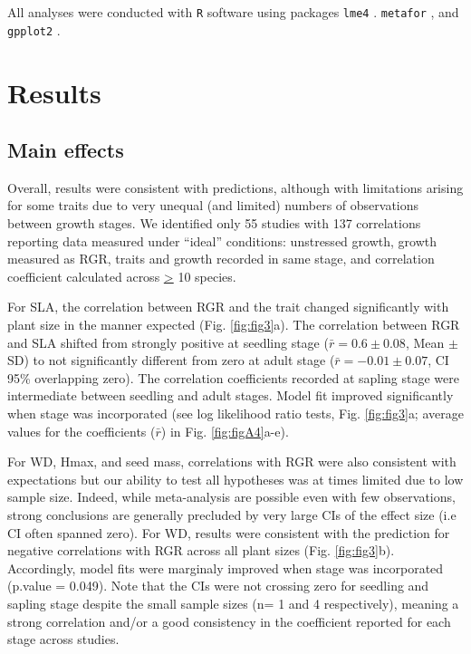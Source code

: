 \documentclass[a4paper,11pt]{article}
\begin{document}
All analyses were conducted with \texttt{R} software \citep{Ralanguageanden:2014wf} using packages \texttt{lme4} \citep{Bates-2014}. \texttt{metafor} \citep{Viechtbauer-2010}, and \texttt{gpplot2} \citep{Wickham:2009}.



\section*{Results}\label{results}


\subsection*{Main effects}

Overall, results were consistent with predictions, although with limitations arising for some traits due to very unequal (and limited) numbers of observations between growth stages. We identified only 55 studies with 137 correlations reporting data measured under ``ideal'' conditions: unstressed growth, growth measured as RGR, traits and growth recorded in same stage, and correlation coefficient calculated across \underline{\textgreater} 10 species. 

For SLA, the correlation between RGR and the trait changed significantly with plant size in the manner expected (Fig. \ref{fig:fig3}a). The correlation between RGR and SLA shifted from strongly positive at seedling stage ($\bar{r}=0.6 \pm 0.08$, Mean $\pm$ SD) to not significantly different from zero at adult stage ($\bar{r}= -0.01 \pm 0.07$, CI 95\% overlapping zero). The correlation coefficients recorded at sapling stage were intermediate between seedling and adult stages. Model fit improved significantly when stage was incorporated (see log likelihood ratio tests, Fig. \ref{fig:fig3}a; average values for the coefficients ($\bar{r}$) in Fig. \ref{fig:figA4}a-e).

For WD, Hmax, and seed mass, correlations with RGR were also consistent with expectations but our ability to test all hypotheses was at times limited due to low sample size. Indeed, while meta-analysis are possible even with few observations, strong conclusions are generally precluded by very large CIs of the effect size (i.e CI often spanned zero). 
For WD, results were consistent with the prediction for negative correlations with RGR across all plant sizes (Fig. \ref{fig:fig3}b). Accordingly, model fits were marginaly improved when stage was incorporated (p.value = 0.049). Note that the CIs were not crossing zero for seedling and sapling stage despite the small sample sizes (n= 1 and 4 respectively), meaning a strong correlation and/or a good consistency in the coefficient reported for each stage across studies. 
\end{document}
